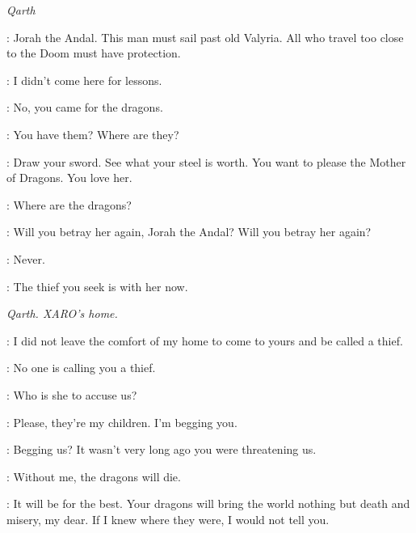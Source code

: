 


\scene

\textit{Qarth}


\QUAITHE: Jorah the Andal. This man must sail past old Valyria. All who travel too close to the Doom must have protection.

\JORAH: I didn't come here for lessons.

\QUAITHE: No, you came for the dragons.

\JORAH: You have them? Where are they?


\QUAITHE: Draw your sword. See what your steel is worth. You want to please the Mother of Dragons. You love her.

\JORAH: Where are the dragons?

\QUAITHE: Will you betray her again, Jorah the Andal? Will you betray her again?

\JORAH: Never.

\QUAITHE: The thief you seek is with her now.



\scene

\textit{Qarth. XARO's home.}


\SPICEKING: I did not leave the comfort of my home to come to yours and be called a thief.

\XARO: No one is calling you a thief.

\SPICEKING: Who is she to accuse us?

\DAENERYS: Please, they're my children. I'm begging you.

\SILKKING: Begging us? It wasn't very long ago you were threatening us.

\DAENERYS: Without me, the dragons will die.

\SPICEKING: It will be for the best. Your dragons will bring the world nothing but death and misery, my dear. If I knew where they were, I would not tell you.

